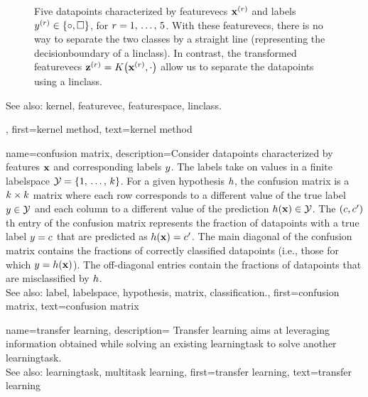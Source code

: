 {{\begin{figure}[H]
\begin{center}
\end{center}
\caption{
Five \glspl{datapoint} characterized by \glspl{featurevec} ${\bf x}^{(r)}$ 
and \glspl{label} $y^{(r)} \in \{ \circ, \square \}$, for $r=1, \,\ldots, \,5$. 
With these \glspl{featurevec}, there is no way to separate the two classes 
by a straight line (representing the \gls{decisionboundary} of a \gls{linclass}). 
In contrast, the transformed \glspl{featurevec} ${\bf z}^{(r)} = K\big({\bf x}^{(r)},\cdot\big)$ 
allow us to separate the \glspl{datapoint} using a \gls{linclass}.  \label{fig_linsep_kernel_dict}}
\end{figure}
		See also: \gls{kernel}, \gls{featurevec}, \gls{featurespace}, \gls{linclass}.},
	first={kernel method},
	text={kernel method} 
}
	

{name={confusion matrix}, 
	description={Consider \glspl{datapoint} characterized 
		by \glspl{feature} ${\bf x}$ and corresponding \glspl{label} $y$. 
		The \glspl{label} take on values in a finite \gls{labelspace} $\mathcal{Y} = \{1, \,\ldots, \,k\}$. 
		For a given \gls{hypothesis} $h$, the confusion \gls{matrix} is a 
		$k \times k$ \gls{matrix} where each row corresponds to a different 
		value of the true \gls{label} $y \in \mathcal{Y}$ and each column to a 
		different value of the \gls{prediction} $h({\bf x}) \in \mathcal{Y}$. 
		The $(c,c')$th entry of the confusion \gls{matrix} represents the fraction of 
		\glspl{datapoint} with a true \gls{label} $y = c$ that are predicted as 
		$h({\bf x}) = c'$. The main diagonal of the confusion \gls{matrix} 
		contains the fractions of correctly classified \glspl{datapoint} (i.e., those for which 
		$y = h({\bf x})$). The off-diagonal entries contain the fractions of
		\glspl{datapoint} that are misclassified by $h$.
				\\
		See also: \gls{label}, \gls{labelspace}, \gls{hypothesis}, \gls{matrix}, \gls{classification}.},
	first={confusion matrix},
	text={confusion matrix} 
}

{name={transfer learning},
  description=
  {Transfer learning aims at leveraging information obtained while solving an existing \gls{learningtask} to 
   solve another \gls{learningtask}.\\ 
   See also: \gls{learningtask}, \gls{multitask learning}},
  first={transfer learning},
  text={transfer learning}
}



